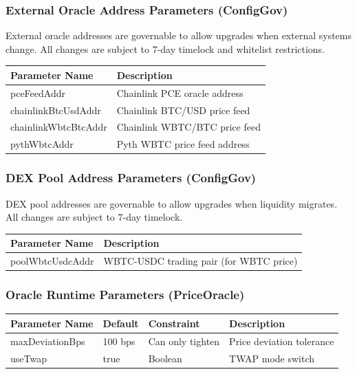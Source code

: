 \documentclass{article}
\begin{document}
\subsubsection{External Oracle Address Parameters (ConfigGov)}

External oracle addresses are governable to allow upgrades when external systems change. All changes are subject to 7-day timelock and whitelist restrictions.

\begin{center}
\begin{longtable}{p{5cm}p{9cm}}
\toprule
Parameter Name & Description \\
\midrule
\endhead
pceFeedAddr & Chainlink PCE oracle address \\
chainlinkBtcUsdAddr & Chainlink BTC/USD price feed \\
chainlinkWbtcBtcAddr & Chainlink WBTC/BTC price feed \\
pythWbtcAddr & Pyth WBTC price feed address \\
\bottomrule
\end{longtable}
\end{center}

\subsubsection{DEX Pool Address Parameters (ConfigGov)}

DEX pool addresses are governable to allow upgrades when liquidity migrates. All changes are subject to 7-day timelock.

\begin{center}
\begin{longtable}{p{4.5cm}p{9.5cm}}
\toprule
Parameter Name & Description \\
\midrule
\endhead
poolWbtcUsdcAddr & WBTC-USDC trading pair (for WBTC price) \\
\bottomrule
\end{longtable}
\end{center}

\subsubsection{Oracle Runtime Parameters (PriceOracle)}

\begin{center}
\begin{longtable}{p{4.5cm}p{2.5cm}p{3cm}p{4cm}}
\toprule
Parameter Name & Default & Constraint & Description \\
\midrule
\endhead
maxDeviationBps & 100 bps & Can only tighten & Price deviation tolerance \\
useTwap & true & Boolean & TWAP mode switch \\
\bottomrule
\end{longtable}
\end{center}
\end{document}
